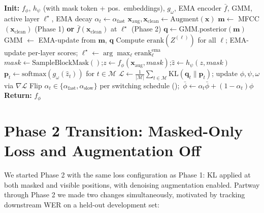\documentclass[9pt,twocolumn]{article}
\theoremstyle{plain}
\theoremstyle{definition}
\theoremstyle{remark}
\begin{document}
\begin{algorithm}[t]
\small
\caption{S-JEPA training. Phase~1 uses a fixed MFCC GMM; Phase~2 uses the online encoder-feature GMM with adaptive layer selection and switched EMA decay.}
\label{alg:training}
\begin{algorithmic}[1]
\STATE \textbf{Init:} $f_\phi$, $h_\psi$ (with mask token + pos.\ embeddings), $g_\omega$, EMA encoder $\bar{f}$, GMM, active layer $\ell^\star$, EMA decay $\alpha_t \gets \alpha_{\text{fast}}$
    \STATE $\mathbf{x}_{\text{aug}}, \mathbf{x}_{\text{clean}} \gets \text{Augment}(\mathbf{x})$
    \STATE $\mathbf{m} \gets$ MFCC$(\mathbf{x}_{\text{clean}})$ (Phase 1) \textbf{or} $\bar{f}(\mathbf{x}_{\text{clean}})$ at $\ell^\star$ (Phase 2) 
    \STATE $\mathbf{q} \gets \text{GMM.posterior}(\mathbf{m})$
        \STATE GMM $\gets$ EMA-update from $\mathbf{m}$, $\mathbf{q}$ 
            \STATE Compute $\mathrm{erank}(Z^{(\ell)})$ for all $\ell$; EMA-update per-layer scores; $\ell^\star \gets \arg\max_\ell \mathrm{erank}^{\text{ema}}_\ell$
        \ENDIF
    \ENDIF
    \STATE $\mathit{mask} \gets \text{SampleBlockMask}()$;\quad $z \gets f_\phi(\mathbf{x}_{\text{aug}}, \mathit{mask})$;\quad $\hat{z} \gets h_\psi(z, \mathit{mask})$
    \STATE $\mathbf{p}_t \gets \text{softmax}(g_\omega(\hat{z}_t))$ for $t \in \mathcal{M}$
    \STATE $\mathcal{L} \gets \tfrac{1}{|\mathcal{M}|} \sum_{t \in \mathcal{M}} \text{KL}(\mathbf{q}_t \| \mathbf{p}_t)$; update $\phi, \psi, \omega$ via $\nabla \mathcal{L}$
        \STATE Flip $\alpha_t \in \{\alpha_{\text{fast}}, \alpha_{\text{slow}}\}$ per switching schedule ();\, $\bar{\phi} \gets \alpha_t \bar{\phi} + (1-\alpha_t) \phi$
    \ENDIF
\ENDFOR
\STATE \textbf{Return:} $f_\phi$ 
\end{algorithmic}
\end{algorithm}
\section{Phase 2 Transition: Masked-Only Loss and Augmentation Off}
\label{app:phase2_transition}

We started Phase 2 with the same loss configuration as Phase 1: KL applied at both masked and visible positions, with denoising augmentation enabled. Partway through Phase 2 we made two changes simultaneously, motivated by tracking downstream WER on a held-out development set:
\end{document}

